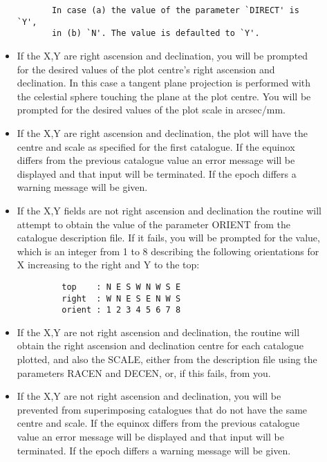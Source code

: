 \begin{description}
\begin{itemize}
\begin{verbatim}
       In case (a) the value of the parameter `DIRECT' is `Y',
       in (b) `N'. The value is defaulted to `Y'.
\end{verbatim}
\item If the X,Y are right ascension and declination, you will be
prompted for the desired values of the plot centre's right ascension
and declination.
In this case a tangent plane projection is performed with the celestial
sphere touching the plane at the plot centre.
You will be prompted for the desired values of the plot scale in
arcsec/mm.
\item If the X,Y are right ascension and declination, the plot will have
the centre and scale as specified for the first catalogue.
If the equinox differs from the previous catalogue value an error message
will be displayed and that input will be terminated.
If the epoch differs a warning message will be given.
\item If the X,Y fields are not right ascension and declination the routine
will attempt to obtain the value of the parameter ORIENT from the
catalogue description file.
If it fails, you will be prompted for the value, which is an integer
from 1 to 8 describing the following orientations for X increasing to the
right and Y to the top:
\begin{verbatim}
         top    : N E S W N W S E
         right  : W N E S E N W S
         orient : 1 2 3 4 5 6 7 8
\end{verbatim}
\item If the X,Y are not right ascension and declination, the routine
will obtain the right ascension and declination centre for each
catalogue plotted, and also the SCALE, either from the description file
using the parameters RACEN and DECEN, or, if this fails, from you.
\item If the X,Y are not right ascension and declination, you will
be prevented from superimposing catalogues that do not have the same
centre and scale.
If the equinox differs from the previous catalogue value an error message
will be displayed and that input will be terminated.
If the epoch differs a warning message will be given.
\end{itemize}
\end{description}
